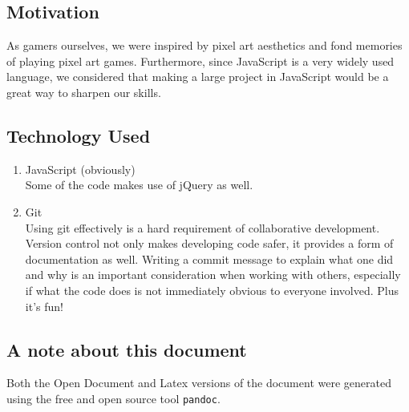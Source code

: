 \documentclass[11pt]{article}
\begin{document}
\subsection{Motivation}
\label{sec:org536091f}
As gamers ourselves, we were inspired by pixel art aesthetics and fond memories of playing pixel art games. Furthermore, since JavaScript is a very widely used language, we considered that making a large project in JavaScript would be a great way to sharpen our skills.\\
\subsection{Technology Used}
\label{sec:orgf9d5bde}
\begin{enumerate}
\item JavaScript (obviously)\\
Some of the code makes use of jQuery as well.\\
\item Git\\
Using git effectively is a hard requirement of collaborative development. Version control not only makes developing code safer, it provides a form of documentation as well. Writing a commit message to explain what one did and why is an important consideration when working with others, especially if what the code does is not immediately obvious to everyone involved. Plus it's fun!\\
\end{enumerate}


\subsection{A note about this document}
\label{sec:org0579f4e}
Both the Open Document and Latex versions of the document were generated using the free and open source tool \texttt{pandoc}.\\
\end{document}
